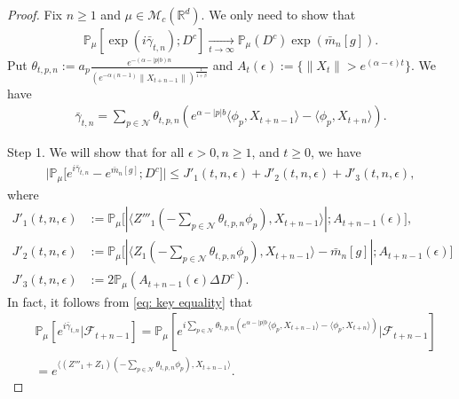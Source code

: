 \documentclass[12pt,a4paper]{amsart}
\theoremstyle{plain}
\theoremstyle{definition}
\numberwithin{equation}{section}
\begin{document}
\begin{proof}
  Fix $n\ge 1$ and $\mu\in\mathcal{M}_c(\mathbb{R}^d)$.
  We only need to show that
  \begin{align}
    \mathbb{P}_{\mu}[\exp(i\bar{\gamma}_{t,n}); D^c]
    \xrightarrow[t\rightarrow \infty]{}\mathbb{P}_{\mu}(D^c)\exp(\bar{m}_n[g]).
  \end{align}
  Put $ \theta_{ t, p, n} := a_p \frac { e^{ - ( \alpha - | p | b ) n } } { ( e^{ - \alpha ( n - 1 ) } \| X_{ t + n - 1 } \| )^{ \frac { 1 } { 1 + \beta } } } $ and $ A_t(\epsilon):=\{\|X_t\| > e^{(\alpha-\epsilon)t}\}$.
  We have
  \begin{align}
    \bar{\gamma}_{t,n}
    =\sum_{p\in \mathcal{N}}\theta_{t,p,n}(e^{\alpha-|p|b}\langle \phi_p, X_{t+n-1}\rangle-\langle \phi_p, X_{t+n}\rangle).
  \end{align}

	Step 1. We will show that for all $\epsilon > 0, n\geq 1$, and $t\geq 0$, we have
  \begin{align}
    \big|\mathbb{P}_{\mu}\big[e^{i\bar{\gamma}_{t,n}}-e^{\bar{m}_n[g]}; D^c\big]\big|
    \leq J'_1(t,n,\epsilon)+J'_2(t,n,\epsilon)+J'_3(t,n,\epsilon),
  \end{align}
	where
  \begin{align}
    \label{eq: Def of JJ1}
    J'_1(t,n,\epsilon)
    & := \mathbb{P}_{\mu}\big[|\langle Z'''_1(-\sum_{p\in \mathcal{N}}\theta_{t,p,n}\phi_p), X_{t+n-1}\rangle|; A_{t+n-1}(\epsilon) \big], \\ 
    J'_2(t,n,\epsilon)
    & := \mathbb{P}_{\mu}\big[|\langle Z_1(-\sum_{p\in \mathcal{N}}\theta_{t,p,n}\phi_p),X_{t+n-1}\rangle-\bar{m}_n[g]|; A_{t+n-1}(\epsilon)\big] \\
    J'_3(t,n, \epsilon)
    & := 2\mathbb{P}_{\mu}(A_{t+n-1}(\epsilon)\Delta D^c).
  \end{align}
  In fact, it follows from \eqref{eq: key equality} that
  \begin{align}
    \label{eq: need11}
    & \displaystyle\mathbb{P}_{\mu}[e^{i\bar{\gamma}_{t,n}}|\mathscr{F}_{t+n-1}]
      = \mathbb{P}_{\mu}[e^{i\sum_{p\in \mathcal{N}}\theta_{t,p,n}(e^{\alpha-|p|b}\langle \phi_p,X_{t+n-1}\rangle-\langle \phi_p, X_{t+n}\rangle)}|\mathscr{F}_{t+n-1}] \\
    & = \displaystyle e^{\langle (Z'''_1+Z_1)(-\sum_{p\in \mathcal{N}}\theta_{t,p,n}\phi_p), X_{t+n-1} \rangle}.
  \end{align}


\end{proof}
\end{document}
